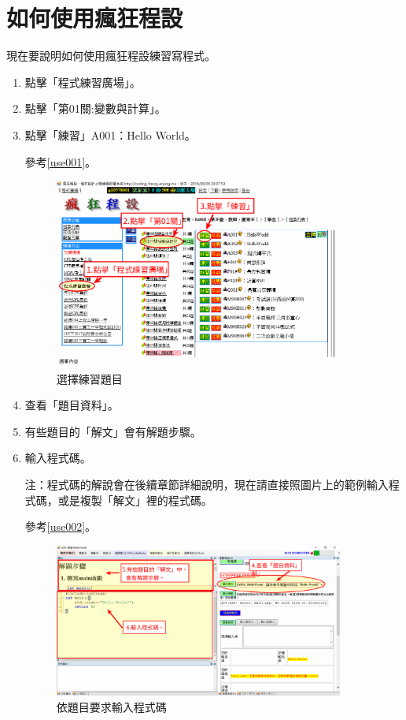 \section{如何使用瘋狂程設}
現在要說明如何使用瘋狂程設練習寫程式。

\begin{enumerate}
\item 點擊「程式練習廣場」。
\item 點擊「第01關:變數與計算」。
\item 點擊「練習」A001：Hello World。

參考\autoref{use001}。
\begin{figure}[H]
	\centering
	\includegraphics[width=0.9\textwidth]{fig/install_and_setting/use_001}
	\caption{選擇練習題目}
	\label{use001}
\end{figure}


\item 查看「題目資料」。
\item 有些題目的「解文」會有解題步驟。
\item 輸入程式碼。

注：程式碼的解說會在後續章節詳細說明，現在請直接照圖片上的範例輸入程式碼，或是複製「解文」裡的程式碼。

參考\autoref{use002}。
\begin{figure}[H]
	\centering
	\includegraphics[width=0.9\textwidth]{fig/install_and_setting/use_002}
	\caption{依題目要求輸入程式碼}
	\label{use002}
\end{figure}


\end{enumerate}
